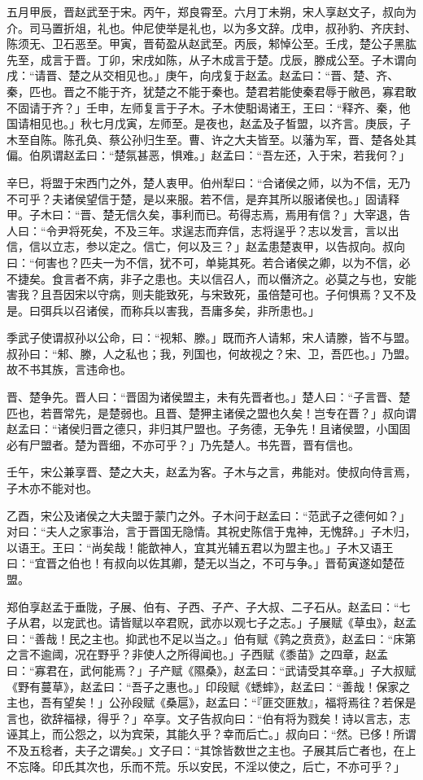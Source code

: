 \documentclass[]{article}
\begin{document}
五月甲辰，晋赵武至于宋。丙午，郑良霄至。六月丁未朔，宋人享赵文子，叔向为介。司马置折俎，礼也。仲尼使举是礼也，以为多文辞。戊申，叔孙豹、齐庆封、陈须无、卫石恶至。甲寅，晋荀盈从赵武至。丙辰，邾悼公至。壬戌，楚公子黑肱先至，成言于晋。丁卯，宋戌如陈，从子木成言于楚。戊辰，滕成公至。子木谓向戌：``请晋、楚之从交相见也。」庚午，向戌复于赵孟。赵孟曰：``晋、楚、齐、秦，匹也。晋之不能于齐，犹楚之不能于秦也。楚君若能使秦君辱于敝邑，寡君敢不固请于齐？」壬申，左师复言于子木。子木使馹谒诸王，王曰：``释齐、秦，他国请相见也。」秋七月戊寅，左师至。是夜也，赵孟及子皙盟，以齐言。庚辰，子木至自陈。陈孔奂、蔡公孙归生至。曹、许之大夫皆至。以藩为军，晋、楚各处其偏。伯夙谓赵孟曰：``楚氛甚恶，惧难。」赵孟曰：``吾左还，入于宋，若我何？」

辛巳，将盟于宋西门之外，楚人衷甲。伯州犁曰：``合诸侯之师，以为不信，无乃不可乎？夫诸侯望信于楚，是以来服。若不信，是弃其所以服诸侯也。」固请释甲。子木曰：``晋、楚无信久矣，事利而已。苟得志焉，焉用有信？」大宰退，告人曰：``令尹将死矣，不及三年。求逞志而弃信，志将逞乎？志以发言，言以出信，信以立志，参以定之。信亡，何以及三？」赵孟患楚衷甲，以告叔向。叔向曰：``何害也？匹夫一为不信，犹不可，单毙其死。若合诸侯之卿，以为不信，必不捷矣。食言者不病，非子之患也。夫以信召人，而以僭济之。必莫之与也，安能害我？且吾因宋以守病，则夫能致死，与宋致死，虽倍楚可也。子何惧焉？又不及是。曰弭兵以召诸侯，而称兵以害我，吾庸多矣，非所患也。」

季武子使谓叔孙以公命，曰：``视邾、滕。」既而齐人请邾，宋人请滕，皆不与盟。叔孙曰：``邾、滕，人之私也；我，列国也，何故视之？宋、卫，吾匹也。」乃盟。故不书其族，言违命也。

晋、楚争先。晋人曰：``晋固为诸侯盟主，未有先晋者也。」楚人曰：``子言晋、楚匹也，若晋常先，是楚弱也。且晋、楚狎主诸侯之盟也久矣！岂专在晋？」叔向谓赵孟曰：``诸侯归晋之德只，非归其尸盟也。子务德，无争先！且诸侯盟，小国固必有尸盟者。楚为晋细，不亦可乎？」乃先楚人。书先晋，晋有信也。

壬午，宋公兼享晋、楚之大夫，赵孟为客。子木与之言，弗能对。使叔向侍言焉，子木亦不能对也。

乙酉，宋公及诸侯之大夫盟于蒙门之外。子木问于赵孟曰：``范武子之德何如？」对曰：``夫人之家事治，言于晋国无隐情。其祝史陈信于鬼神，无愧辞。」子木归，以语王。王曰：``尚矣哉！能歆神人，宜其光辅五君以为盟主也。」子木又语王曰：``宜晋之伯也！有叔向以佐其卿，楚无以当之，不可与争。」晋荀寅遂如楚莅盟。

郑伯享赵孟于垂陇，子展、伯有、子西、子产、子大叔、二子石从。赵孟曰：``七子从君，以宠武也。请皆赋以卒君贶，武亦以观七子之志。」子展赋《草虫》，赵孟曰：``善哉！民之主也。抑武也不足以当之。」伯有赋《鹑之贲贲》，赵孟曰：``床第之言不逾阈，况在野乎？非使人之所得闻也。」子西赋《黍苗》之四章，赵孟曰：``寡君在，武何能焉？」子产赋《隰桑》，赵孟曰：``武请受其卒章。」子大叔赋《野有蔓草》，赵孟曰：``吾子之惠也。」印段赋《蟋蟀》，赵孟曰：``善哉！保家之主也，吾有望矣！」公孙段赋《桑扈》，赵孟曰：``『匪交匪敖』，福将焉往？若保是言也，欲辞福禄，得乎？」卒享。文子告叔向曰：``伯有将为戮矣！诗以言志，志诬其上，而公怨之，以为宾荣，其能久乎？幸而后亡。」叔向曰：``然。已侈！所谓不及五稔者，夫子之谓矣。」文子曰：``其馀皆数世之主也。子展其后亡者也，在上不忘降。印氏其次也，乐而不荒。乐以安民，不淫以使之，后亡，不亦可乎？」
\end{document}
